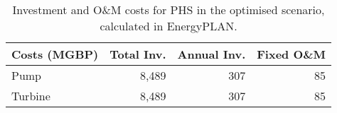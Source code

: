 \begin{table}[htbp]
	\caption{Investment and O\&M costs for PHS in the optimised scenario, calculated in EnergyPLAN.}
	\label{tbl:EP_PHS_total_costs}
	\centering
	\begin{tabular}{@{}lrrr@{}}
		\toprule
		Costs (MGBP) & Total Inv. & Annual Inv. & Fixed O\&M \\ \midrule
		Pump & 8,489 & 307 & 85 \\
		Turbine & 8,489 & 307 & 85 \\ \bottomrule
	\end{tabular}
\end{table}